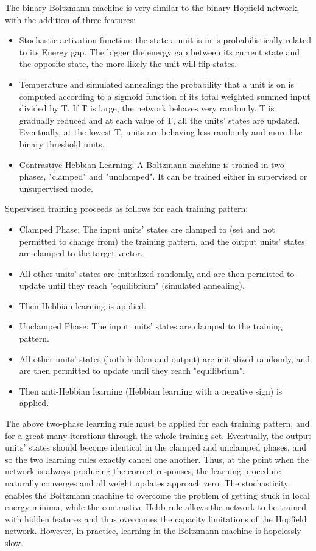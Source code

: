 The binary Boltzmann machine is very similar to the binary Hopfield network, with the addition of three features:
\begin{itemize}
\item Stochastic activation function: the state a unit is in is probabilistically related to its Energy gap. The bigger the energy gap between its current state and the opposite state, the more likely the unit will flip states.
\item Temperature and simulated annealing: the probability that a unit is on is computed according to a sigmoid function of its total weighted summed input divided by T. If T is large, the network behaves very randomly. T is gradually reduced and at each value of T, all the units' states are updated. Eventually, at the lowest T, units are behaving less randomly and more like binary threshold units.
\item Contrastive Hebbian Learning: A Boltzmann machine is trained in two phases, "clamped" and "unclamped". It can be trained either in supervised or unsupervised mode. 
\end{itemize}
Supervised training proceeds as follows for each training pattern:
\begin{itemize}
\item Clamped Phase: The input units' states are clamped to (set and not permitted to change from) the training pattern, and the output units' states are clamped to the target vector.
\item All other units' states are initialized randomly, and are then permitted to update until they reach "equilibrium" (simulated annealing).
\item Then Hebbian learning is applied.
\item Unclamped Phase: The input units' states are clamped to the training pattern.
\item All other units' states (both hidden and output) are initialized randomly, and are then permitted to update until they reach "equilibrium".
\item Then anti-Hebbian learning (Hebbian learning with a negative sign) is applied.
\end{itemize}

The above two-phase learning rule must be applied for each training pattern, and for a great many iterations through the whole training set. Eventually, the output units' states should become identical in the clamped and unclamped phases, and so the two learning rules exactly cancel one another. Thus, at the point when the network is always producing the correct responses, the learning procedure naturally converges and all weight updates approach zero.
The stochasticity enables the Boltzmann machine to overcome the problem of getting stuck in local energy minima, while the contrastive Hebb rule allows the network to be trained with hidden features and thus overcomes the capacity limitations of the Hopfield network. However, in practice, learning in the Boltzmann machine is hopelessly slow.

